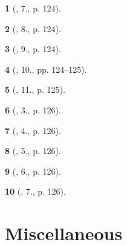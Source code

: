 \documentclass{article}
\newtheorem{baitoan}{}
\begin{document}
\begin{baitoan}[\cite{SGK_Toan_11_hinh_hoc_co_ban}, 7., p. 124]
	
\end{baitoan}

\begin{baitoan}[\cite{SGK_Toan_11_hinh_hoc_co_ban}, 8., p. 124]
	
\end{baitoan}

\begin{baitoan}[\cite{SGK_Toan_11_hinh_hoc_co_ban}, 9., p. 124]
	
\end{baitoan}

\begin{baitoan}[\cite{SGK_Toan_11_hinh_hoc_co_ban}, 10., pp. 124--125]
	
\end{baitoan}

\begin{baitoan}[\cite{SGK_Toan_11_hinh_hoc_co_ban}, 11., p. 125]
	
\end{baitoan}

\begin{baitoan}[\cite{SGK_Toan_11_hinh_hoc_co_ban}, 3., p. 126]
	
\end{baitoan}

\begin{baitoan}[\cite{SGK_Toan_11_hinh_hoc_co_ban}, 4., p. 126]
	
\end{baitoan}

\begin{baitoan}[\cite{SGK_Toan_11_hinh_hoc_co_ban}, 5., p. 126]
	
\end{baitoan}

\begin{baitoan}[\cite{SGK_Toan_11_hinh_hoc_co_ban}, 6., p. 126]
	
\end{baitoan}

\begin{baitoan}[\cite{SGK_Toan_11_hinh_hoc_co_ban}, 7., p. 126]
	
\end{baitoan}



\section{Miscellaneous}


\printbibliography[heading=bibintoc]
	
\end{document}
